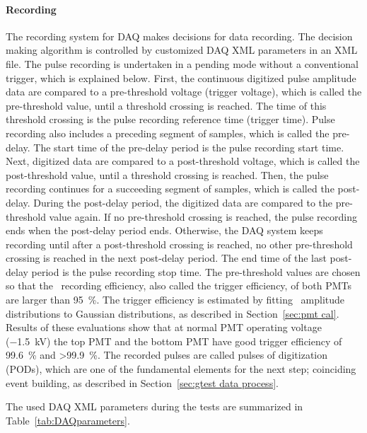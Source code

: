 \paragraph{Recording} %
The recording system for DAQ makes decisions for data recording. The decision making algorithm is controlled by customized DAQ XML parameters in an XML file. The pulse recording is undertaken in a pending mode without a conventional trigger, which is explained below. First, the continuous digitized pulse amplitude data are compared to a pre-threshold voltage (trigger voltage), which is called the pre-threshold value, until a threshold crossing is reached. The time of this threshold crossing is the pulse recording reference time (trigger time). Pulse recording also includes a preceding segment of samples, which is called the pre-delay. The start time of the pre-delay period is the pulse recording start time. Next, digitized data are compared to a post-threshold voltage, which is called the post-threshold value, until a threshold crossing is reached. Then, the pulse recording continues for a succeeding segment of samples, which is called the post-delay. During the post-delay period, the digitized data are compared to the pre-threshold value again. If no pre-threshold crossing is reached, the pulse recording ends when the post-delay period ends. Otherwise, the DAQ system keeps recording until after a post-threshold crossing is reached, no other pre-threshold crossing is reached in the next post-delay period. The end time of the last post-delay period is the pulse recording stop time. The pre-threshold values are chosen so that the \sphe\ recording efficiency, also called the trigger efficiency, of both PMTs are larger than \SI{95}{\percent}. The trigger efficiency is estimated by fitting \sphe\ amplitude distributions to Gaussian distributions, as described in Section~\ref{sec:pmt cal}. Results of these evaluations show that at normal PMT operating voltage (\SI{-1.5}{\kV}) the top PMT and the bottom PMT have good trigger efficiency of \SI{99.6}{\percent} and \SI{>99.9}{\percent}. The recorded pulses are called pulses of digitization (PODs), which are one of the fundamental elements for the next step; coinciding event building, as described in Section~\ref{sec:gtest data process}.

The used DAQ XML parameters during the tests are summarized in Table~\ref{tab:DAQparameters}.

